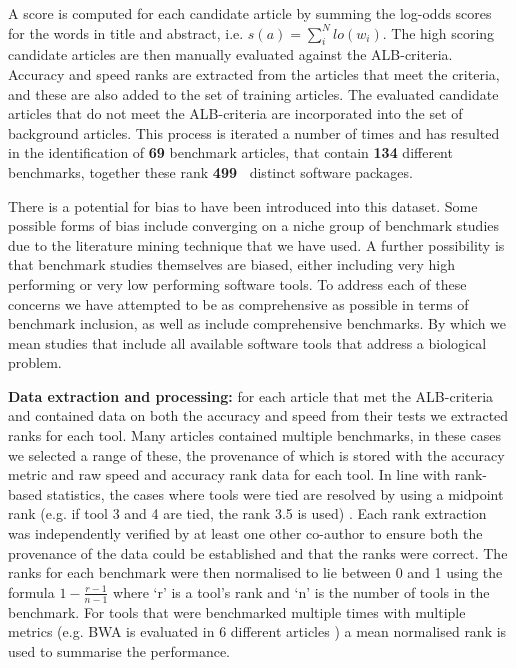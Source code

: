 \documentclass[fleqn,10pt]{SelfArx} %
\def\numTools{499}
\def\numBenchmarkPubs{69}
\def\numBenchmarks{134}
\begin{document}
A score is computed for each candidate article by summing the log-odds
scores for the words in title and abstract,
i.e. $s(a)=\sum_i^Nlo(w_i)$. The high scoring candidate articles are
then manually evaluated against the ALB-criteria. Accuracy and speed
ranks are extracted from the articles that meet the criteria, and
these are also added to the set of training articles. The evaluated
candidate articles that do not meet the ALB-criteria are incorporated
into the set of background articles. This process is iterated a number
of times and has resulted in the identification of
\textbf{{\color{red}\numBenchmarkPubs}} benchmark articles, that
contain \textbf{{\color{red}\numBenchmarks}} different benchmarks, together these
rank \textbf{{\color{red}\numTools~}} distinct software packages.

There is a potential for bias to have been introduced into this
dataset. Some possible forms of bias include converging on a niche
group of benchmark studies due to the literature mining technique that
we have used. A further possibility is that benchmark studies
themselves are biased, either including very high performing or very
low performing software tools. To address each of these concerns we
have attempted to be as comprehensive as possible in terms of
benchmark inclusion, as well as include comprehensive benchmarks. By
which we mean studies that include all available software tools that
address a biological problem.

\textbf{Data extraction and processing:} for each article that met the
ALB-criteria and contained data on both the accuracy and speed from
their tests we extracted ranks for each tool. Many articles contained
multiple benchmarks, in these cases we selected a range of these, the
provenance of which is stored with the accuracy metric and raw speed
and accuracy rank data for each tool. In line with rank-based
statistics, the cases where tools were tied are resolved by using a
midpoint rank (e.g. if tool 3 and 4 are tied, the rank 3.5 is used)
\cite{Mann1947-re}. Each rank extraction was independently verified by
at least one other co-author to ensure both the provenance of the data
could be established and that the ranks were correct. The ranks for
each benchmark were then normalised to lie between 0 and 1 using the
formula $1-\frac{r-1}{n-1}$ where ‘r’ is a tool’s rank and ‘n’ is the
number of tools in the benchmark. For tools that were benchmarked
multiple times with multiple metrics (e.g. BWA is evaluated in 6
different articles
\cite{Bao2011-lv,Caboche2014-lj,Hatem2013-cs,Schbath2012-ob,Ruffalo2011-rl,Holtgrewe2011-fd})
a mean normalised rank is used to summarise the performance.
 
\end{document}
